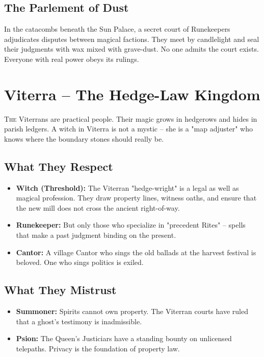 \documentclass[10pt,a5paper]{book}
\begin{document}
\subsection*{The Parlement of Dust}
In the catacombs beneath the Sun Palace, a secret court of Runekeepers adjudicates disputes between magical factions. They meet by candlelight and seal their judgments with wax mixed with grave-dust. No one admits the court exists. Everyone with real power obeys its rulings.

\section{Viterra -- The Hedge-Law Kingdom}

\lettrine{T}{he} Viterrans are practical people. Their magic grows in hedgerows and hides in parish ledgers. A witch in Viterra is not a mystic -- she is a "map adjuster" who knows where the boundary stones should really be.

\subsection*{What They Respect}
\begin{itemize}
    \item \textbf{Witch (Threshold):} The Viterran "hedge-wright" is a legal as well as magical profession. They draw property lines, witness oaths, and ensure that the new mill does not cross the ancient right-of-way.
    \item \textbf{Runekeeper:} But only those who specialize in "precedent Rites" -- spells that make a past judgment binding on the present.
    \item \textbf{Cantor:} A village Cantor who sings the old ballads at the harvest festival is beloved. One who sings politics is exiled.
\end{itemize}

\subsection*{What They Mistrust}
\begin{itemize}
    \item \textbf{Summoner:} Spirits cannot own property. The Viterran courts have ruled that a ghost's testimony is inadmissible.
    \item \textbf{Psion:} The Queen's Justiciars have a standing bounty on unlicensed telepaths. Privacy is the foundation of property law.
\end{itemize}
\end{document}
